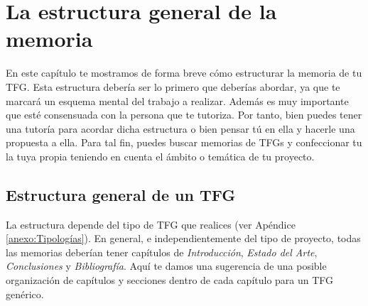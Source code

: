 \chapter{La estructura general de la memoria}
\label{cap:EstructuraMemoria}

En este capítulo te mostramos de forma breve cómo estructurar la memoria de tu TFG. Esta estructura debería ser lo primero que deberías abordar, ya que te marcará un esquema mental del trabajo a realizar. Además es muy importante que esté consensuada con la persona que te tutoriza. Por tanto, bien puedes tener una tutoría para acordar dicha estructura o bien pensar tú en ella y hacerle una propuesta a ella. Para tal fin, puedes buscar memorias de TFGs y confeccionar tu la tuya propia teniendo en cuenta el ámbito o temática de tu proyecto.

\section{Estructura general de un TFG}

La estructura depende del tipo de TFG que realices (ver Apéndice \ref{anexo:Tipologías}). En general, e independientemente del tipo de proyecto, todas las memorias deberían tener capítulos de \textit{Introducción}, \textit{Estado del Arte}, \textit{Conclusiones} y \textit{Bibliografía}. Aquí te damos una sugerencia de una posible organización de capítulos y secciones dentro de cada capítulo para un TFG genérico. 

